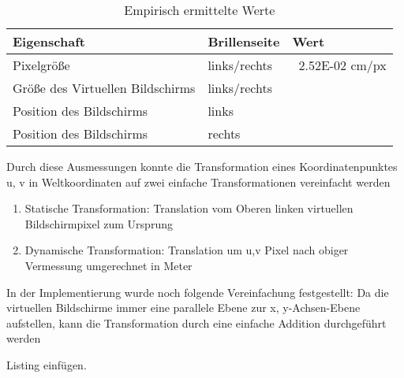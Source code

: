  \begin{table}
 \caption{Empirisch ermittelte Werte}
 \begin{tabular}{l|l|l}
  Eigenschaft & Brillenseite & Wert \\
  \hline
  \hline
  Pixelgröße & links/rechts & ~2.52E-02 cm/px \\
  Größe des Virtuellen Bildschirms & links/rechts &  \\
  Position des Bildschirms & links & \\
  Position des Bildschirms & rechts & \\
 \end{tabular}
 \label{tab:konstanteWerte}
 \end{table}
            
Durch diese Ausmessungen konnte die  Transformation eines Koordinatenpunktes u, v in Weltkoordinaten auf zwei einfache Transformationen vereinfacht werden

   \begin{enumerate}
      \item Statische Transformation: Translation vom Oberen linken virtuellen Bildschirmpixel zum Ursprung
      \item Dynamische Transformation: Translation um u,v Pixel nach obiger Vermessung umgerechnet in Meter
   \end{enumerate}


In der Implementierung wurde noch folgende Vereinfachung festgestellt: Da die virtuellen Bildschirme immer eine parallele Ebene zur x, y-Achsen-Ebene aufstellen, kann die Transformation durch eine einfache Addition durchgeführt werden

    Listing einfügen.

